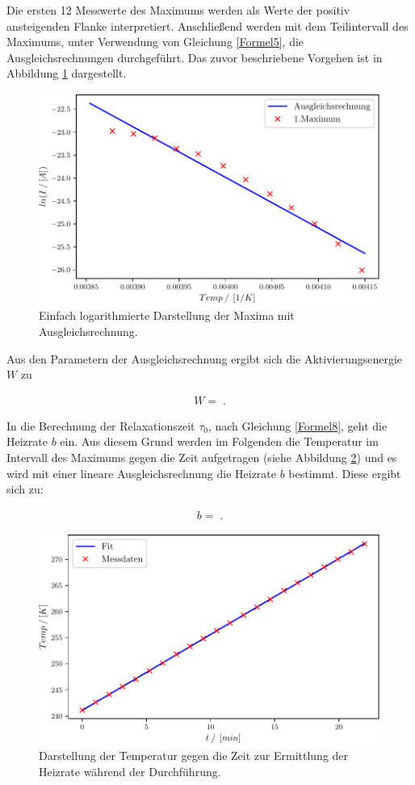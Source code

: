 Die ersten 12 Messwerte des Maximums werden als Werte der positiv ansteigenden Flanke interpretiert. Anschließend werden mit dem Teilintervall des Maximums, unter Verwendung von Gleichung \eqref{Formel5}, die Ausgleichsrechnungen durchgeführt. Das zuvor beschriebene Vorgehen ist in Abbildung \ref{fig:Auswertung_18_19} dargestellt.

\begin{figure}[H]
  \centering
  \includegraphics[width=.75\textwidth]{build/2_Temp_current_peak_log_fit.pdf}
  \caption{Einfach logarithmierte Darstellung der Maxima mit Ausgleichsrechnung.}
  \label{fig:Auswertung_18_19}
\end{figure}

Aus den Parametern der Ausgleichsrechnung ergibt sich die Aktivierungsenergie $W$ zu

\begin{align}
	W = \;.
\end{align}

In die Berechnung der Relaxationszeit $\tau_0$, nach Gleichung \eqref{Formel8}, geht die Heizrate $b$ ein. Aus diesem Grund werden im Folgenden die Temperatur im Intervall des Maximums gegen die Zeit aufgetragen (siehe Abbildung \ref{fig:Auswertung_20_21}) und es wird mit einer lineare Ausgleichsrechnung die Heizrate $b$ bestimmt. Diese ergibt sich zu:

\begin{align}
	b = \;.
\end{align}

\begin{figure}[H]
  \centering
  \includegraphics[width=.75\textwidth]{build/2_Temp_Time_Peak1.pdf}
  \caption{Darstellung der Temperatur gegen die Zeit zur Ermittlung der Heizrate während der Durchführung.}
  \label{fig:Auswertung_20_21}
\end{figure}

